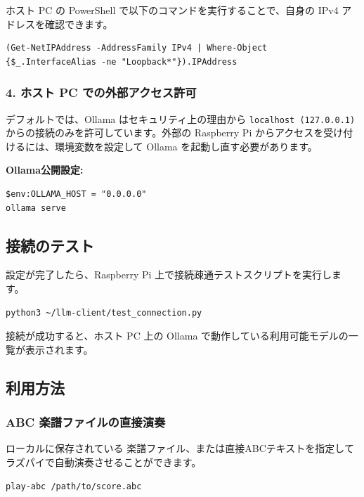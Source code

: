 \begin{tcolorbox}[tipbox, title=ホスト PC の IP アドレスを確認する方法]
  ホスト PC の PowerShell で以下のコマンドを実行することで、自身の IPv4 アドレスを確認できます。
  \begin{lstlisting}[style=powershell]
(Get-NetIPAddress -AddressFamily IPv4 | Where-Object {$_.InterfaceAlias -ne "Loopback*"}).IPAddress
  \end{lstlisting}
\end{tcolorbox}

\subsubsection{4. ホスト PC での外部アクセス許可}
デフォルトでは、Ollama はセキュリティ上の理由から \texttt{localhost (127.0.0.1)} からの接続のみを許可しています。外部の Raspberry Pi からアクセスを受け付けるには、環境変数を設定して Ollama を起動し直す必要があります。

\textbf{Ollama公開設定:}\\
\begin{lstlisting}[style=powershell]
$env:OLLAMA_HOST = "0.0.0.0"
ollama serve
\end{lstlisting}

\subsection{接続のテスト}

設定が完了したら、Raspberry Pi 上で接続疎通テストスクリプトを実行します。
\begin{lstlisting}[language=bash]
python3 ~/llm-client/test_connection.py
\end{lstlisting}
接続が成功すると、ホスト PC 上の Ollama で動作している利用可能モデルの一覧が表示されます。

\subsection{利用方法}

\subsubsection{ABC 楽譜ファイルの直接演奏}
ローカルに保存されている  楽譜ファイル、または直接ABCテキストを指定してラズパイで自動演奏させることができます。
\begin{lstlisting}[language=bash]
play-abc /path/to/score.abc
\end{lstlisting}

